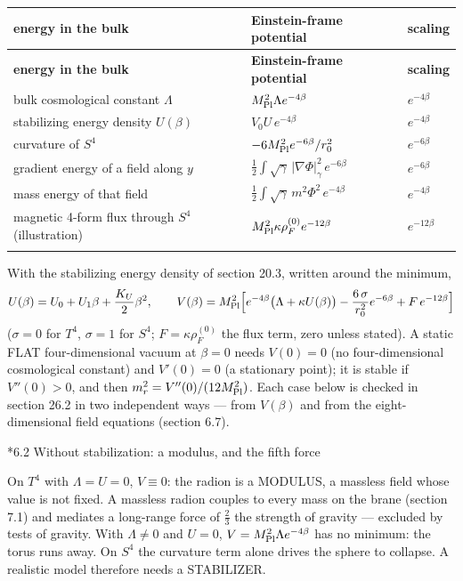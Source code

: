 \documentclass[10pt,a4paper]{article}
\makeatletter
\renewcommand\subsection{\@startsection{subsection}{2}{\z@}{-3.25ex\@plus -1ex \@minus -.2ex}{1.5ex \@plus .2ex}{\normalfont\large\bfseries\raggedright}}
\makeatother
\begin{document}
{\small
\begin{longtable}{>{\raggedright\arraybackslash}p{}>{\raggedright\arraybackslash}p{}>{\raggedright\arraybackslash}p{}}
\toprule
\textbf{energy in the bulk} & \textbf{Einstein-frame potential} & \textbf{scaling} \\
\midrule\endfirsthead
\toprule
\textbf{energy in the bulk} & \textbf{Einstein-frame potential} & \textbf{scaling} \\
\midrule\endhead
\endfoot
\bottomrule\endlastfoot
bulk cosmological constant $\Lambda$ & $M_{\rm Pl}^2\Lambda e^{-4\beta}$ & $e^{-4\beta}$ \\
stabilizing energy density $U(\beta)$ & $V_0U\,e^{-4\beta}$ & $e^{-4\beta}$ \\
curvature of $S^4$ & $-6M_{\rm Pl}^2e^{-6\beta}/r_0^2$ & $e^{-6\beta}$ \\
gradient energy of a field along $y$ & $\frac12\int\sqrt\gamma\,|\nabla\Phi|_\gamma^2\,e^{-6\beta}$ & $e^{-6\beta}$ \\
mass energy of that field & $\frac12\int\sqrt\gamma\,m^2\Phi^2\,e^{-4\beta}$ & $e^{-4\beta}$ \\
magnetic 4-form flux through $S^4$ (illustration) & $M_{\rm Pl}^2\kappa\rho_F^{(0)}e^{-12\beta}$ & $e^{-12\beta}$ \\*
\end{longtable}}
With the stabilizing energy density of section 20.3, written around the minimum,
\begin{equation*}
U(\beta)=U_0+U_1\beta+\frac{K_U}2\beta^2,\qquad V(\beta)=M_{\rm Pl}^2\Big[e^{-4\beta}\big(\Lambda+\kappa U(\beta)\big)-\frac{6\,\sigma}{r_0^2}e^{-6\beta}+F\,e^{-12\beta}\Big]
\end{equation*}
($\sigma=0$ for $T^4$, $\sigma=1$ for $S^4$; $F=\kappa\rho_F^{(0)}$ the flux term, zero unless stated). A static FLAT four-dimensional vacuum at $\beta=0$ needs $V(0)=0$ (no four-dimensional cosmological constant) and $V'(0)=0$ (a stationary point); it is stable if $V''(0)>0$, and then $m_r^2=V''(0)/(12M_{\rm Pl}^2)$. Each case below is checked in section 26.2 in two independent ways — from $V(\beta)$ and from the eight-dimensional field equations (section 6.7).

\subsection*{6.2 Without stabilization: a modulus, and the fifth force}
On $T^4$ with $\Lambda=U=0$, $V\equiv0$: the radion is a MODULUS, a massless field whose value is not fixed. A massless radion couples to every mass on the brane (section 7.1) and mediates a long-range force of $\frac23$ the strength of gravity — excluded by tests of gravity. With $\Lambda\ne0$ and $U=0$, $V=M_{\rm Pl}^2\Lambda e^{-4\beta}$ has no minimum: the torus runs away. On $S^4$ the curvature term alone drives the sphere to collapse. A realistic model therefore needs a STABILIZER.
\end{document}
